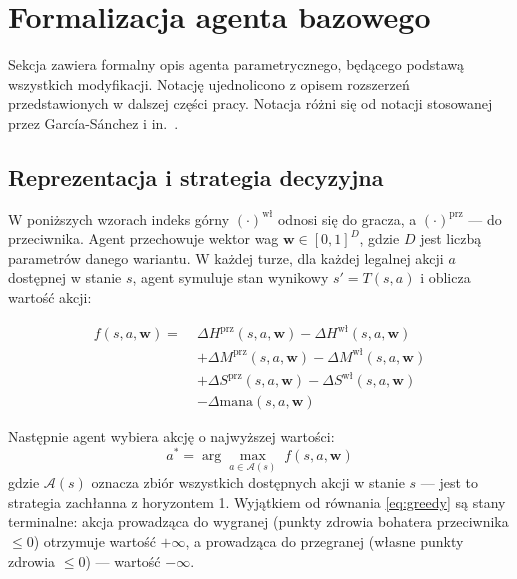 \section{Formalizacja agenta bazowego} \label{sec:formalization}

Sekcja zawiera formalny opis agenta parametrycznego, będącego podstawą wszystkich modyfikacji. Notację ujednolicono z opisem rozszerzeń przedstawionych w dalszej części pracy. Notacja różni się od notacji stosowanej przez García-Sánchez i in.~\cite{sanchez2020}.

\subsection{Reprezentacja i strategia decyzyjna}

W poniższych wzorach indeks górny $(\cdot)^{\text{wł}}$ odnosi się do gracza, a $(\cdot)^{\text{prz}}$ --- do przeciwnika. Agent przechowuje wektor wag $\mathbf{w} \in [0,1]^D$, gdzie $D$ jest liczbą parametrów danego wariantu. W każdej turze, dla każdej legalnej akcji $a$ dostępnej w stanie $s$, agent symuluje stan wynikowy $s' = T(s, a)$ i oblicza wartość akcji:

\begin{equation}
\begin{split}
    f(s, a, \mathbf{w}) =\;
        & \Delta H^{\text{prz}}(s, a, \mathbf{w}) - \Delta H^{\text{wł}}(s, a, \mathbf{w}) \\
        & + \Delta M^{\text{prz}}(s, a, \mathbf{w}) - \Delta M^{\text{wł}}(s, a, \mathbf{w}) \\
        & + \Delta S^{\text{prz}}(s, a, \mathbf{w}) - \Delta S^{\text{wł}}(s, a, \mathbf{w}) \\
        & - \Delta \text{mana}(s, a, \mathbf{w})
\end{split}
    \label{eq:score}
\end{equation}


Następnie agent wybiera akcję o najwyższej wartości:
\begin{equation}
    a^* = \arg\max_{a \in \mathcal{A}(s)}\; f(s, a, \mathbf{w})
    \label{eq:greedy}
\end{equation}
gdzie $\mathcal{A}(s)$ oznacza zbiór wszystkich dostępnych akcji w stanie $s$ --- jest to strategia zachłanna z horyzontem 1. Wyjątkiem od równania \eqref{eq:greedy} są stany terminalne: akcja prowadząca do wygranej (punkty zdrowia bohatera przeciwnika $\leq 0$) otrzymuje wartość $+\infty$, a prowadząca do przegranej (własne punkty zdrowia $\leq 0$) --- wartość $-\infty$.


